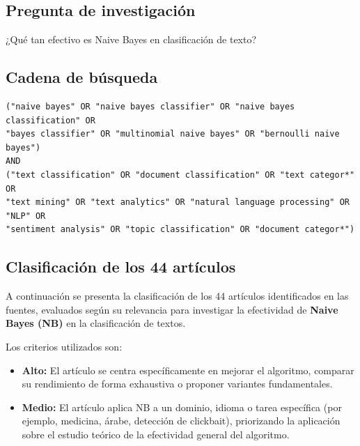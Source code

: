 \documentclass[11pt,a4paper]{article}
\begin{document}
\subsection{Pregunta de investigación}\label{pregunta-de-investigaciuxf3n}

¿Qué tan efectivo es Naive Bayes en clasificación de texto?

\subsection{Cadena de búsqueda}\label{cadena-de-buxfasqueda}

\begin{verbatim}
("naive bayes" OR "naive bayes classifier" OR "naive bayes classification" OR
"bayes classifier" OR "multinomial naive bayes" OR "bernoulli naive bayes")
AND
("text classification" OR "document classification" OR "text categor*" OR
"text mining" OR "text analytics" OR "natural language processing" OR "NLP" OR
"sentiment analysis" OR "topic classification" OR "document categor*")
\end{verbatim}

\subsection{Clasificación de los 44 artículos}\label{clasificaciuxf3n-de-los-44-artuxedculos}

A continuación se presenta la clasificación de los 44 artículos identificados en las fuentes, evaluados según su relevancia para investigar la efectividad de \textbf{Naive Bayes (NB)} en la clasificación de textos.

Los criterios utilizados son:
\begin{itemize}
    \item \textbf{Alto:} El artículo se centra específicamente en mejorar el algoritmo, comparar su rendimiento de forma exhaustiva o proponer variantes fundamentales.
    \item \textbf{Medio:} El artículo aplica NB a un dominio, idioma o tarea específica (por ejemplo, medicina, árabe, detección de clickbait), priorizando la aplicación sobre el estudio teórico de la efectividad general del algoritmo.
\end{itemize}
\end{document}
